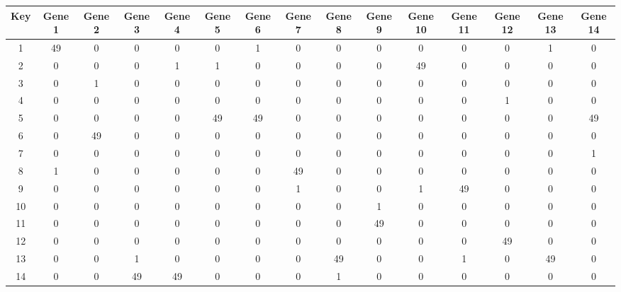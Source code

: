 \begin{tabular}{|c|c|c|c|c|c|c|c|c|c|c|c|c|c|c|}
\hline
Key & Gene 1 & Gene 2 & Gene 3 & Gene 4 & Gene 5 & Gene 6 & Gene 7 & Gene 8 & Gene 9 & Gene 10 & Gene 11 & Gene 12 & Gene 13 & Gene 14 \\
\hline
1 & 49 & 0 & 0 & 0 & 0 & 1 & 0 & 0 & 0 & 0 & 0 & 0 & 1 & 0 \\
2 & 0 & 0 & 0 & 1 & 1 & 0 & 0 & 0 & 0 & 49 & 0 & 0 & 0 & 0 \\
3 & 0 & 1 & 0 & 0 & 0 & 0 & 0 & 0 & 0 & 0 & 0 & 0 & 0 & 0 \\
4 & 0 & 0 & 0 & 0 & 0 & 0 & 0 & 0 & 0 & 0 & 0 & 1 & 0 & 0 \\
5 & 0 & 0 & 0 & 0 & 49 & 49 & 0 & 0 & 0 & 0 & 0 & 0 & 0 & 49 \\
6 & 0 & 49 & 0 & 0 & 0 & 0 & 0 & 0 & 0 & 0 & 0 & 0 & 0 & 0 \\
7 & 0 & 0 & 0 & 0 & 0 & 0 & 0 & 0 & 0 & 0 & 0 & 0 & 0 & 1 \\
8 & 1 & 0 & 0 & 0 & 0 & 0 & 49 & 0 & 0 & 0 & 0 & 0 & 0 & 0 \\
9 & 0 & 0 & 0 & 0 & 0 & 0 & 1 & 0 & 0 & 1 & 49 & 0 & 0 & 0 \\
10 & 0 & 0 & 0 & 0 & 0 & 0 & 0 & 0 & 1 & 0 & 0 & 0 & 0 & 0 \\
11 & 0 & 0 & 0 & 0 & 0 & 0 & 0 & 0 & 49 & 0 & 0 & 0 & 0 & 0 \\
12 & 0 & 0 & 0 & 0 & 0 & 0 & 0 & 0 & 0 & 0 & 0 & 49 & 0 & 0 \\
13 & 0 & 0 & 1 & 0 & 0 & 0 & 0 & 49 & 0 & 0 & 1 & 0 & 49 & 0 \\
14 & 0 & 0 & 49 & 49 & 0 & 0 & 0 & 1 & 0 & 0 & 0 & 0 & 0 & 0 \\
\hline
\end{tabular}